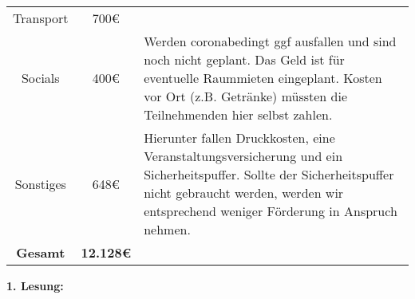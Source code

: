 {\begin{tabular}{c c p{10cm}}
        Transport & 700€ & \\
        Socials & 400€ & Werden coronabedingt ggf ausfallen und sind noch nicht geplant. Das Geld ist für eventuelle Raummieten eingeplant. Kosten vor Ort (z.B. Getränke) müssten die Teilnehmenden hier selbst zahlen. \\
        Sonstiges & 648€ & Hierunter fallen Druckkosten, eine Veranstaltungsversicherung und ein Sicherheitspuffer. Sollte der Sicherheitspuffer nicht gebraucht werden, werden wir entsprechend weniger Förderung in Anspruch nehmen. \\ 
        \textbf{Gesamt} & \textbf{12.128€} & \\       
    \end{tabular}
}{
    \textbf{1. Lesung:}
    \ul{}

}
